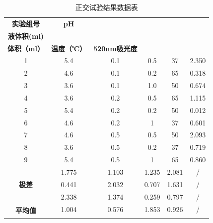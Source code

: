 \documentclass[10.5pt, a4paper]{ctexart}
\begin{document}
\begin{table}[H]
\centering
\caption{正交试验结果数据表}
\begin{tabular}{|c|c|c|c|c|c|}
\hline
\textbf{实验组号} & \textbf{pH} & \makecell{\textbf{蔗糖稀释}\\ \textbf{液体积(ml)}} & \makecell{\textbf{蔗糖溶液}\\\textbf{体积（ml）} }& \textbf{温度（℃）} & \textbf{520nm吸光度} \\ \hline
1 & \cellcolor{lightpink}5.4 & \cellcolor{lightblue}0.1 & \cellcolor{lightyellow}0.5 & \cellcolor{lightblue}37 & 2.350 \\ \hline
2 & \cellcolor{lightyellow}4.6 & \cellcolor{lightblue}0.1 & \cellcolor{lightblue}0.2 & \cellcolor{lightpink}65 & 0.318 \\ \hline
3 & \cellcolor{lightblue}3.6 & \cellcolor{lightblue}0.1 & \cellcolor{lightpink}1.0 & \cellcolor{lightyellow}50 & 0.674 \\ \hline
4 & \cellcolor{lightblue}3.6 & \cellcolor{lightyellow}0.2 & \cellcolor{lightblue}0.5 & \cellcolor{lightpink}65 & 1.115 \\ \hline
5 & \cellcolor{lightpink}5.4 & \cellcolor{lightyellow}0.2 & \cellcolor{lightblue}0.2 & \cellcolor{lightyellow}50 & 0.012 \\ \hline
6 & \cellcolor{lightyellow}4.6 & \cellcolor{lightyellow}0.2 & \cellcolor{lightpink}1 & \cellcolor{lightblue}37 & 0.601 \\ \hline
7 & \cellcolor{lightyellow}4.6 & \cellcolor{lightpink}0.5 & \cellcolor{lightyellow}0.5 & \cellcolor{lightblue}50 & 2.093 \\ \hline
8 & \cellcolor{lightblue}3.6 & \cellcolor{lightpink}0.5 & \cellcolor{lightblue}0.2 & \cellcolor{lightblue}37 & 0.719 \\ \hline
9 & \cellcolor{lightpink}5.4 & \cellcolor{lightpink}0.5 & \cellcolor{lightblue}1 & \cellcolor{lightpink}65 & 0.860 \\ \hline
\multirow{3}{*}{\textbf{极差}} & \cellcolor{lightyellow}1.775 & \cellcolor{lightyellow}1.103 & \cellcolor{lightyellow}1.235 & \cellcolor{lightyellow}2.081 & / \\ \cline{2-6}
 & \cellcolor{lightblue}0.441 & \cellcolor{lightblue}2.032 & \cellcolor{lightblue}0.707 & \cellcolor{lightblue}1.631 & / \\ \cline{2-6}
 & \cellcolor{lightpink}2.338 & \cellcolor{lightpink}1.374 & \cellcolor{lightpink}0.259 & \cellcolor{lightpink}0.797 & / \\ \hline
 \multirow{3}{*}{\textbf{平均值}} & \cellcolor{lightyellow}1.004 & \cellcolor{lightyellow}0.576 & \cellcolor{lightyellow}1.853 & \cellcolor{lightyellow}0.926 & / \\ \cline{2-6}

\end{tabular}
\end{table}
\end{document}

